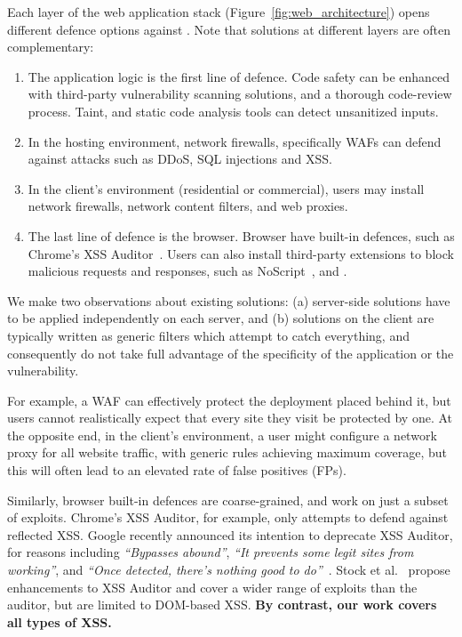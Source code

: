 Each layer of the web application stack  (Figure~\ref{fig:web_architecture}) opens different defence options against \xss. Note that solutions at different layers are often complementary:
\begin{enumerate}

\item The application logic is the first line of defence.
  Code safety can be enhanced with third-party vulnerability scanning solutions, and a thorough
  code-review process. Taint, and static code analysis tools can detect unsanitized inputs.

\item In the hosting environment, network firewalls, specifically \acp{WAF} can defend against attacks such as \ac{DDoS}, \ac{SQL} injections and \ac{XSS}.

\item In the client's environment (residential or commercial), users may install network firewalls, network content filters, and web proxies.

\item The last line of defence is the browser.
  Browser have built-in defences, such as
  Chrome's \ac{XSS} Auditor~\cite{xssauditor}. Users can also
  install third-party extensions to block malicious requests and
  responses, such as NoScript~\cite{Noscript}, and \sys.
\end{enumerate}

We make two observations about existing solutions: (a) server-side
solutions have to be applied independently on each server, and (b)
solutions on the client are typically written as generic filters which
attempt to catch everything, and consequently do not take full advantage
of the specificity of the application or the vulnerability.

For example, a \ac{WAF} can effectively protect the deployment placed
behind it, but users cannot realistically expect that every site they
visit be protected by one. At the opposite end, in the client's
environment, a user might configure a network proxy for all website
traffic, with generic rules achieving maximum coverage, but this
will often lead to an elevated rate of false positives (FPs).

Similarly, browser built-in defences are coarse-grained, and 
work on just a subset of exploits. Chrome's XSS Auditor, for example, only
attempts to defend against reflected \ac{XSS}. Google recently
announced its intention to deprecate XSS Auditor, for reasons
including \emph{``Bypasses abound''}, \emph{``It prevents some legit
  sites from working''}, and \emph{``Once detected, there's nothing
  good to do''}~\cite{deprecatexssauditor}. Stock et
al.~\cite{precise_dom_xss} propose enhancements to XSS Auditor and
cover a wider range of exploits than the auditor, but are limited to
DOM-based \ac{XSS}.  \textbf{By contrast, our work covers all types of \ac{XSS}.}

